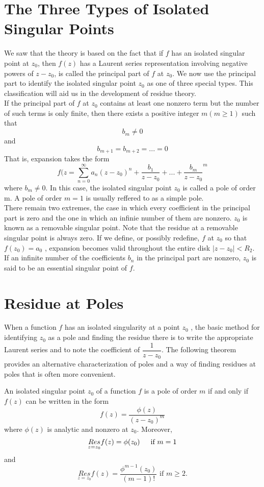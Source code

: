 \section{The Three Types of Isolated Singular Points}
We saw that the theory is based on the fact that if $ f $ has an isolated singular point at $ z_0 $, then $ f(z) $ has a Laurent series representation involving negative powers of $ z - z_0 $, is called the principal part of $ f $ at $ z_0 $. We now use the principal part to identify the isolated singular point $ z_0 $ as one of three special types. This classification will aid us in the development of residue theory. \\ \indent If the principal part of $ f $ at $ z_0 $ contains at least one nonzero term but the number of such terms is only finite, then there exists a positive integer $ m ( m \geq 1) $ such that \[ b_m \neq 0 \] and \[ b_{m+1} = b_{m+2}=...=0 \] That is, expansion takes the form 
\[ f(z = \sum\limits_{n=0}^{\infty} a_n (z-z_0)^n + \dfrac{b_1}{z -z_0} + ... + \dfrac{b_m}{z -z_0}^m \] where $ b_m \neq 0 $. In this case, the isolated singular point $ z_0 $ is called a pole of order m. A pole of order $ m =1 $ is usually reffered to as a simple pole. \\ There remain two extremes, the case in which every coefficient in the principal part is zero and the one in which an infinie number of them are nonzero. $ z_0 $ is known as a removable singular point. Note that the residue at a removable singular point is always zero. If we define, or possibly redefine, $ f $ at $ z_0 $ so that $ f(z_0 ) = a_0 $ , expansion becomes valid throughout the entire disk $ |z-z_0| < R_2 $. \\ If an infinite number of the coefficients $ b_n $ in the principal part are nonzero, $ z_0 $ is said to be an essential singular point of $ f $. 
\section{Residue at Poles}
When a function $ f $ has an isolated singularity at a point $ z_0 $ , the basic method for
identifying $ z_0 $ as a pole and finding the residue there is to write the appropriate
Laurent series and to note the coefficient of $ \dfrac{1}{z-z_0} $. The following theorem
provides an alternative characterization of poles and a way of finding residues at
poles that is often more convenient.
\begin{theorem}
	An isolated singular point $ z_0 $ of a function $ f $ is a pole of order $ m $ if and only if $ f(z) $ can be written in the form 
	\[ f(z) = \dfrac{\phi (z)}{(z-z_0)^m} \]
	where $ \phi(z) $ is analytic and nonzero at $ z_0 $. Moreover, 
	\[ \underset{z = z_0}{Res} f(z) = \phi (z_0) \indent \text{if  } m = 1 \] and 
	\[ \underset{z = z_0}{Res} f(z) = \dfrac{\phi^{m -1} (z_0)}{(m-1)!} \text{ if } m \geq 2. \]
\end{theorem}
